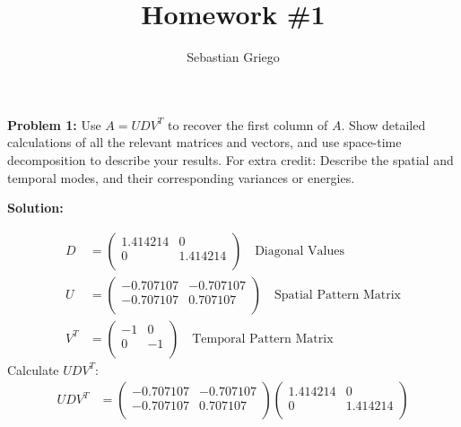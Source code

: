 \documentclass[12pt]{article}
\newenvironment{problem}[1]{
    \textbf{Problem #1:}
}{
    \rmfamily \vspace{1em}
}
\newenvironment{solution}{
    \textbf{Solution:}
    
}{
    
    \vspace{2em}
}
\begin{document}
\title{Homework \#1}  %
\author{Sebastian Griego}  %

\maketitle

\begin{problem}{1} Use \(A = UDV^T\) to recover the first column of \(A\). Show detailed calculations of all the relevant matrices and vectors, and use space-time decomposition to describe your results.
    For extra credit: Describe the spatial and temporal modes, and their corresponding variances or energies.
\end{problem}

\begin{solution}
    \[
        \begin{aligned}
            D &= \begin{pmatrix}
                1.414214 & 0 \\
                0 & 1.414214 \\
            \end{pmatrix} \quad \text{Diagonal Values} \\
            U &= \begin{pmatrix}
                -0.707107 & -0.707107 \\
                -0.707107 & 0.707107 \\
            \end{pmatrix} \quad \text{Spatial Pattern Matrix} \\
            V^T &= \begin{pmatrix}
                -1 & 0 \\
                0 & -1 \\
            \end{pmatrix} \quad \text{Temporal Pattern Matrix}
        \end{aligned}
    \]
    Calculate \(UDV^T\):
    \[
        \begin{aligned}
            UDV^T &= \begin{pmatrix}
                -0.707107 & -0.707107 \\
                -0.707107 & 0.707107 \\
            \end{pmatrix}
            \begin{pmatrix}
                1.414214 & 0 \\
                0 & 1.414214 \\

\end{pmatrix}
\end{aligned}\]
\end{solution}
\end{document}
